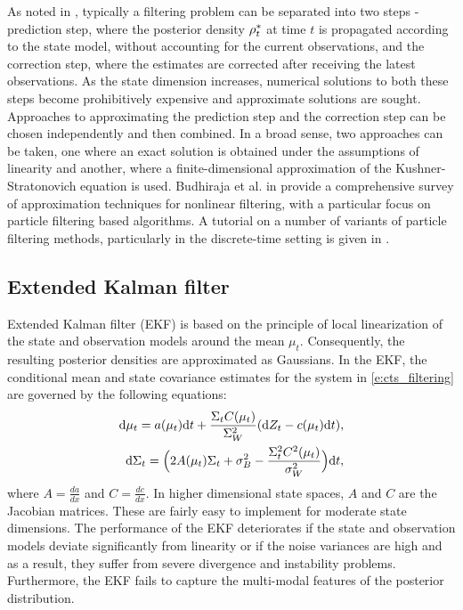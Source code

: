 As noted in , typically a filtering problem can be separated into two steps - prediction step, where the posterior density $\rho^*_t$ at time $t$ is propagated according to the state model, without accounting for the current observations, and the correction step, where the estimates are corrected after receiving the latest observations. As the state dimension increases, numerical solutions to both these steps become prohibitively expensive and approximate solutions are sought. Approaches to approximating the prediction step and the correction step can be chosen independently and then combined. In a broad sense, two approaches can be taken, one where an exact solution is obtained under the assumptions of linearity and another, where a finite-dimensional approximation of the Kushner-Stratonovich equation is used. Budhiraja et al. in \cite{budchelee07} provide a comprehensive survey of approximation techniques for nonlinear filtering, with a particular focus on particle filtering based algorithms. A tutorial on a number of variants of particle filtering methods, particularly in the discrete-time setting is given in \cite{arumasgorcla02}.
\subsection{Extended Kalman filter}
\label{s:ekf}
Extended Kalman filter (EKF) \cite{jaz70} is based on the principle of local linearization of the state and observation models around the mean $\mu_t$. Consequently, the resulting posterior densities are approximated as Gaussians. In the EKF, the conditional mean and state covariance estimates for the system in \eqref{e:cts_filtering} are governed by the following equations: 
\begin{align}
\ud \mu_t = a(\mu_t) \ud t + \frac{\Sigma_t C(\mu_t)}{\Sigma^2_W} (\ud Z_t - c(\mu_t) \ud t), \\
\ud \Sigma_t = \Bigl(2 A(\mu_t) \Sigma_t  + \sigma^2_B - \frac{\Sigma^2_t C^2(\mu_t)}{\sigma^2_W}\Bigr) \ud t, 
\label{e:ekf}
\end{align}
where $A = \frac{d a}{dx}$ and $C = \frac{d c}{dx}$. In higher dimensional state spaces, $A$ and $C$ are the Jacobian matrices. These are fairly easy to implement for moderate state dimensions. The performance of the EKF deteriorates if the state and observation models deviate significantly from linearity or if the noise variances are high and as a result, they suffer from severe divergence and instability problems. Furthermore, the EKF fails to capture the multi-modal features of the posterior distribution.
